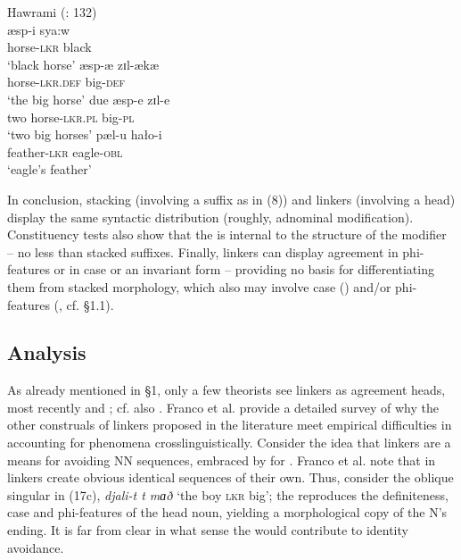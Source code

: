 \documentclass[output=paper]{langsci/langscibook}
\begin{document}
\ea%
    Hawrami  (\citealt{Holmberg2008}: 132)\label{ex:manzini:20}\\
    \ea
    \gll æsp-i     sya:w      \\
         horse-\textsc{lkr}  black\\
    \glt ‘black horse’
    \ex
    \gll æsp{}-æ     zɪl-ækæ\\
         horse-\textsc{lkr.def}  big-\textsc{def}\\
    \glt ‘the big horse’ 
    \ex
    \gll due   æsp-e    zɪl-e \\
         two   horse-\textsc{lkr.pl}  big-\textsc{pl} \\
    \glt ‘two big horses’
    \ex
    \gll pæl-u     hało-i\\
         feather-\textsc{lkr}   eagle-\textsc{obl}\\
    \glt ‘eagle’s feather’ 
    \z
\z        

In conclusion, stacking (involving a suffix as in (8)) and linkers (involving a head) display the same syntactic distribution (roughly, adnominal modification). Constituency tests also show that the  is internal to the structure of the modifier – no less than stacked suffixes. Finally, linkers can display agreement in phi-features or in case or an invariant form – providing no basis for differentiating them from stacked morphology, which also may involve case () and\slash or phi-features (, cf. §1.1).

\subsection{Analysis}\largerpage[-1]
As already mentioned in §1, only a few theorists see linkers as agreement heads, most recently \citet{Philip2012} and \citet{Franco2015}; cf. also \citet{Zwart2006}. Franco et al. provide a detailed survey of why the other construals of linkers proposed in the literature meet empirical difficulties in accounting for  phenomena crosslinguistically. Consider the idea that linkers are a means for avoiding NN sequences, embraced by \citet{Richards2010} for . Franco et al. note that in  linkers create obvious identical sequences of their own. Thus, consider the oblique singular in (17c), \textit{djali-t t mɑð} ‘the boy \textsc{lkr} big’; the  reproduces the definiteness, case and phi-features of the head noun, yielding a morphological copy of the N’s ending. It is far from clear in what sense the  would contribute to identity avoidance.
\end{document}
